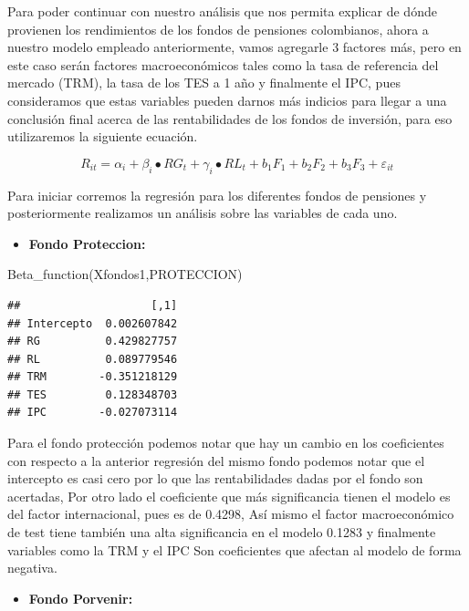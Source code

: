 \documentclass[
  12pt,
]{article}
\newenvironment{Shaded}{\begin{snugshade}}{\end{snugshade}}
\newcommand{\FunctionTok}[1]{\textcolor[rgb]{0.00,0.00,0.00}{#1}}
\newcommand{\NormalTok}[1]{#1}
\providecommand{\tightlist}{%
  \setlength{\itemsep}{0pt}\setlength{\parskip}{0pt}}
\begin{document}
Para poder continuar con nuestro análisis que nos permita explicar de
dónde provienen los rendimientos de los fondos de pensiones colombianos,
ahora a nuestro modelo empleado anteriormente, vamos agregarle 3
factores más, pero en este caso serán factores macroeconómicos tales
como la tasa de referencia del mercado (TRM), la tasa de los TES a 1 año
y finalmente el IPC, pues consideramos que estas variables pueden darnos
más indicios para llegar a una conclusión final acerca de las
rentabilidades de los fondos de inversión, para eso utilizaremos la
siguiente ecuación.

\[
R_{it}=\alpha_i+\beta_i\bullet{RG}_t+\gamma_i\bullet{RL}_t+b_1F_1+b_2F_2+b_3F_3+\varepsilon_{it}
\]

Para iniciar corremos la regresión para los diferentes fondos de
pensiones y posteriormente realizamos un análisis sobre las variables de
cada uno.

\begin{itemize}
\tightlist
\item
  \textbf{Fondo Proteccion:}
\end{itemize}

\begin{Shaded}
\begin{Highlighting}[]
\FunctionTok{Beta\_function}\NormalTok{(Xfondos1,PROTECCION)}
\end{Highlighting}
\end{Shaded}

\begin{verbatim}
##                    [,1]
## Intercepto  0.002607842
## RG          0.429827757
## RL          0.089779546
## TRM        -0.351218129
## TES         0.128348703
## IPC        -0.027073114
\end{verbatim}

Para el fondo protección podemos notar que hay un cambio en los
coeficientes con respecto a la anterior regresión del mismo fondo
podemos notar que el intercepto es casi cero por lo que las
rentabilidades dadas por el fondo son acertadas, Por otro lado el
coeficiente que más significancia tienen el modelo es del factor
internacional, pues es de 0.4298, Así mismo el factor macroeconómico de
test tiene también una alta significancia en el modelo 0.1283 y
finalmente variables como la TRM y el IPC Son coeficientes que afectan
al modelo de forma negativa.

\begin{itemize}
\tightlist
\item
  \textbf{Fondo Porvenir:}
\end{itemize}
\end{document}
